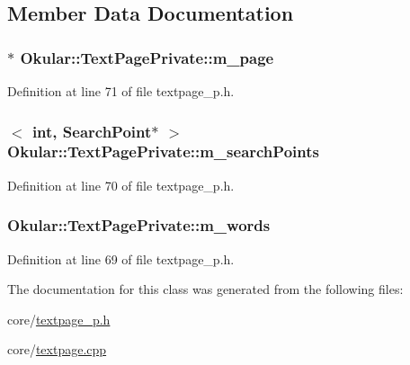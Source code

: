 \subsection{Member Data Documentation}
\hypertarget{classOkular_1_1TextPagePrivate_a6662808b6ba334f5c7abc157759260b9}{
\subsubsection[{m\+\_\+page}]{$\ast$ Okular\+::\+Text\+Page\+Private\+::m\+\_\+page}}\label{classOkular_1_1TextPagePrivate_a6662808b6ba334f5c7abc157759260b9}


Definition at line 71 of file textpage\+\_\+p.\+h.

\hypertarget{classOkular_1_1TextPagePrivate_a4cd8e4b3be609ba6f03c8c85963d7b6e}{
\subsubsection[{m\+\_\+search\+Points}]{$<$ int, {\bf Search\+Point}$\ast$ $>$ Okular\+::\+Text\+Page\+Private\+::m\+\_\+search\+Points}}\label{classOkular_1_1TextPagePrivate_a4cd8e4b3be609ba6f03c8c85963d7b6e}


Definition at line 70 of file textpage\+\_\+p.\+h.

\hypertarget{classOkular_1_1TextPagePrivate_a36b703334a8775136cb4308209afd1cb}{
\subsubsection[{m\+\_\+words}]{ Okular\+::\+Text\+Page\+Private\+::m\+\_\+words}}\label{classOkular_1_1TextPagePrivate_a36b703334a8775136cb4308209afd1cb}


Definition at line 69 of file textpage\+\_\+p.\+h.



The documentation for this class was generated from the following files\+:\begin{DoxyCompactItemize}
\item 
core/\hyperlink{textpage__p_8h}{textpage\+\_\+p.\+h}\item 
core/\hyperlink{textpage_8cpp}{textpage.\+cpp}\end{DoxyCompactItemize}
